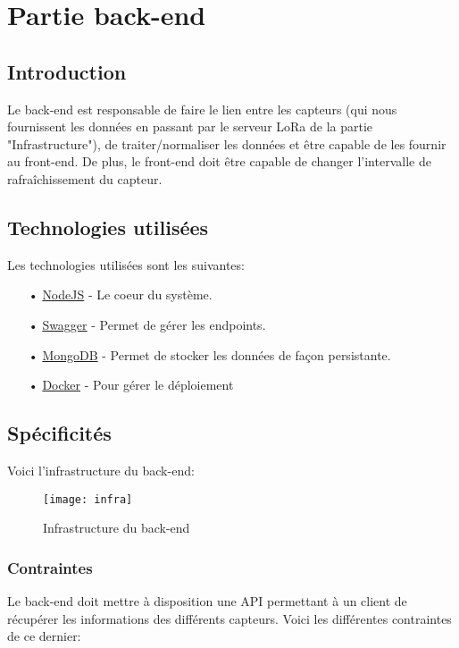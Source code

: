 \chapter{Partie back-end}
\section{Introduction}

Le back-end est responsable de faire le lien entre les capteurs (qui nous fournissent les données en passant par le serveur LoRa de la partie "Infrastructure"), de traiter/normaliser les données et être capable de les fournir au front-end. De plus, le front-end doit être capable de changer l'intervalle de rafraîchissement du capteur.

\section{Technologies utilisées}

Les technologies utilisées sont les suivantes:

\begin{itemize}
\item[•] \href{https://nodejs.org/en/}{NodeJS} - Le coeur du système.
\item[•] \href{https://swagger.io/}{Swagger} - Permet de gérer les endpoints.
\item[•] \href{https://www.mongodb.com/}{MongoDB} - Permet de stocker les données de façon persistante.
\item[•] \href{https://www.docker.com}{Docker} - Pour gérer le déploiement
\end{itemize}

\section{Spécificités}

Voici l'infrastructure du back-end:

\begin{figure}[h!]
\centering
\texttt{[image: infra]}
\caption{Infrastructure du back-end}
\end{figure}
    
\subsection{Contraintes}

Le back-end doit mettre à disposition une API permettant à un client de récupérer les informations des différents capteurs. Voici les différentes contraintes de ce dernier:

